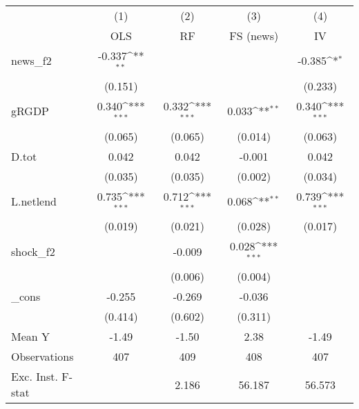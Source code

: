 {
\def\sym#1{\ifmmode^{#1}\else\(^{#1}\)\fi}
\begin{tabular}{l*{4}{c}}
\toprule
            &\multicolumn{1}{c}{(1)}&\multicolumn{1}{c}{(2)}&\multicolumn{1}{c}{(3)}&\multicolumn{1}{c}{(4)}\\
            &\multicolumn{1}{c}{OLS}&\multicolumn{1}{c}{RF}&\multicolumn{1}{c}{FS (news)}&\multicolumn{1}{c}{IV}\\
\midrule
news\_f2     &      -0.337\sym{**} &                     &                     &      -0.385\sym{*}  \\
            &     (0.151)         &                     &                     &     (0.233)         \\
\addlinespace
gRGDP       &       0.340\sym{***}&       0.332\sym{***}&       0.033\sym{**} &       0.340\sym{***}\\
            &     (0.065)         &     (0.065)         &     (0.014)         &     (0.063)         \\
\addlinespace
D.tot       &       0.042         &       0.042         &      -0.001         &       0.042         \\
            &     (0.035)         &     (0.035)         &     (0.002)         &     (0.034)         \\
\addlinespace
L.netlend   &       0.735\sym{***}&       0.712\sym{***}&       0.068\sym{**} &       0.739\sym{***}\\
            &     (0.019)         &     (0.021)         &     (0.028)         &     (0.017)         \\
\addlinespace
shock\_f2    &                     &      -0.009         &       0.028\sym{***}&                     \\
            &                     &     (0.006)         &     (0.004)         &                     \\
\addlinespace
\_cons      &      -0.255         &      -0.269         &      -0.036         &                     \\
            &     (0.414)         &     (0.602)         &     (0.311)         &                     \\
\midrule
Mean Y      &       -1.49         &       -1.50         &        2.38         &       -1.49         \\
Observations&         407         &         409         &         408         &         407         \\
Exc. Inst. F-stat&                     &       2.186         &      56.187         &      56.573         \\
\bottomrule
\end{tabular}
}
